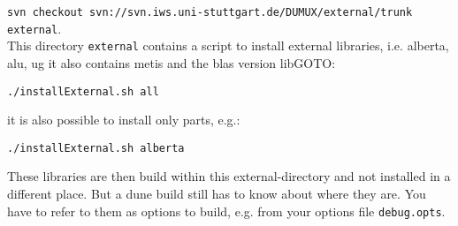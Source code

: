 \texttt{svn checkout svn://svn.iws.uni-stuttgart.de/DUMUX/external/trunk external}. \\

This directory \texttt{external} contains a script to install external libraries, i.e. 
alberta, alu, ug it also contains metis and the blas version libGOTO: 
\begin{center}
\texttt{./installExternal.sh all}
\end{center}
it is also possible to install only parts, e.g.:\\ 
\begin{center}
\texttt{./installExternal.sh alberta}
\end{center}

These libraries are then build within this external-directory and not installed in 
a different place. But a dune build still  has to know about where they are.
You have to refer to them as options to \Dune build, e.g. from your options file \texttt{debug.opts}.


